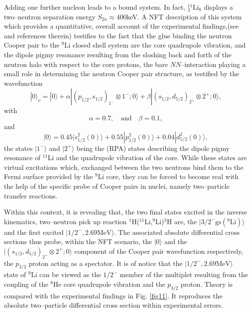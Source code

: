\documentclass[a4paper,14pt]{book}
\begin{document}
Adding one further nucleon leads to a bound system. In fact, $^{11}_3$Li$_8$ displays a two--neutron separation energy $S_{2n}\approx 400$keV. A NFT description of this system which provides a quantitative, overall account of the experimental findings,(see \cite{Barranco:01} and references therein) testifies to the fact that the glue binding the neutron Cooper pair to the $^9$Li closed shell system are the core quadrupole vibration, and the dipole pigmy resonance resulting from the sloshing back and forth of the neutron halo with respect to the core protons, the bare $NN$--interaction playing a small role in determining the neutron Cooper pair structure, as testified by the wavefunction\cite{Potel:10}
\begin{equation}\label{eq21}
|0\rangle_\nu=|0\rangle+\alpha|(p_{1/2},s_{1/2})_{1^-}\otimes 1^-;0\rangle+\beta|(s_{1/2},d_{5/2})_{2^+}\otimes 2^+;0\rangle,
\end{equation}
with
\begin{equation}\label{eq22}
\alpha=0.7,\quad \text{and} \quad \beta=0.1,
\end{equation}
and
\begin{equation}\label{eq23}
|0\rangle=0.45|s_{1/2}^2(0)\rangle+0.55|p_{1/2}^2(0)\rangle+0.04|d_{5/2}^2(0)\rangle,
\end{equation}
the states $|1^-\rangle$ and $|2^+\rangle$ being the (RPA) states describing the dipole pigmy resonance of $^{11}$Li and the quadrupole vibration of the core. While these states are virtual excitations which, exchanged between the two neutrons bind them to the Fermi surface provided by the $^9$Li core, they can be forced to become real with the help of the specific probe of Cooper pairs in nuclei, namely two--particle transfer reactions.


Within this context, it is revealing that, the two final states excited in the inverse kinematics, two--neutron pick up reaction $^1$H($^{11}$Li,$^9$Li)$^3$H are, the $|3/2^-\text{gs}(^9\text{Li})\rangle$ and the first excited $|1/2^-,2.69\text{MeV}\rangle$\cite{Tanihata:08}. The associated absolute differential cross sections thus probe, within the NFT scenario, the $|0\rangle$  and the $|(s_{1/2},d_{5/2})_{2^+}\otimes 2^+;0\rangle$ component of the Cooper pair wavefunction respectively, the $p_{3/2}$ proton acting as a spectator. It is of notice that the $|1/2^-,2.69\text{MeV}\rangle$ state of $^9$Li can be viewed as the $1/2^-$ member of the multiplet resulting from the coupling of the $^8$He core quadrupole vibration and the $p_{3/2}$ proton.
Theory is compared with the experimental findings in Fig. \ref{fig11}. It reproduces the absolute two--particle differential cross section within experimental errors.
\end{document}
